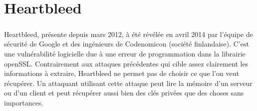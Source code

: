 \chapter{Heartbleed}
\label{chapter:Heartbleed}

\paragraph{}
Heartbleed, présente depuis mars 2012, à été révélée en avril 2014 par l'équipe de sécurité de Google et des ingénieurs de Codenomicon (société finlandaise). C'est une vulnérabilité logicielle due à une erreur de programmation dans la librairie openSSL. Contrairement aux attaques précédentes qui cible assez clairement les informations à extraire, Heartbleed ne permet pas de choisir ce que l'on veut récupérer. Un attaquant utilisant cette attaque peut lire la mémoire d'un serveur ou d'un client et peut récupérer aussi bien des clés privées que des choses sans importances.

